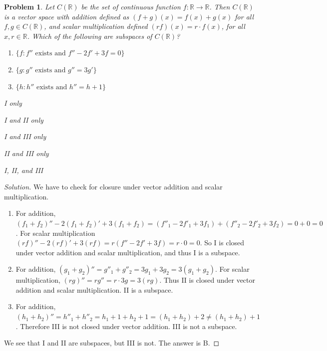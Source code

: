 \documentclass[12pt,oneside]{book}
\theoremstyle{mystyle}
\newtheorem{problem}{Problem}[section]
\begin{document}
\begin{problem}
Let $C(\mathbb{R})$ be the set of continuous function $f:\mathbb{R}\rightarrow \mathbb{R}$. Then $C(\mathbb{R})$ is a vector space with addition defined as $(f+g)(x) = f(x)+g(x)$ for all $f,g\in C(\mathbb{R})$, and scalar multiplication defined $(rf)(x) = r\cdot f(x)$, for all $x,r\in \mathbb{R}$. Which of the following are subspaces of $C(\mathbb{R})$?
\begin{enumerate}
    \item[I] $\{f:f''\textrm{ exists and }f'' - 2f'+3f = 0\}$
    \item[II] $\{g:g''\textrm{ exists and }g'' = 3g' \}$
    \item[III] $\{h:h''\textrm{ exists and }h'' = h+1\}$
\end{enumerate}
\begin{enumerate}
    \begin{multicols}{5}
    \item[A.)] I only
    \item[B.)] I and II only
    \item[C.)] I and III only
    \item[D.)] II and III only
    \item[E.)] I, II, and III
    \end{multicols}
\end{enumerate}
\end{problem}
\begin{proof}[Solution]
We have to check for closure under vector addition and scalar multiplication.
\begin{enumerate}
    \item[I] For addition, $(f_1+f_2)'' - 2(f_1+f_2)' +3(f_1+f_2) = (f''_1 - 2f'_1 +3f_1) + (f''_2 - 2f'_2 +3f_2) = 0+0 = 0$. For scalar multiplication $(rf)'' - 2(rf)' +3(rf) = r(f'' - 2f' + 3f) = r\cdot 0 = 0$. So I is closed under vector addition and scalar multiplication, and thus I is a subspace.
    \item For addition, $(g_1+g_2)'' = g''_1 +g''_2 = 3g_1 + 3g_2 = 3(g_1+g_2)$. For scalar multiplication, $(rg)'' =rg'' = r\cdot 3g = 3(rg)$. Thus II is closed under vector addition and scalar multiplication. II is a subspace.
    \item For addition, $(h_1+h_2)'' = h''_1 + h''_2 = h_1+1 + h_2+1 = (h_1+h_2) + 2 \ne (h_1+h_2)+1$. Therefore III is not closed under vector addition. III is not a subspace.
\end{enumerate}
We see that I and II are subspaces, but III is not. The answer is B.
\end{proof}
\end{document}
